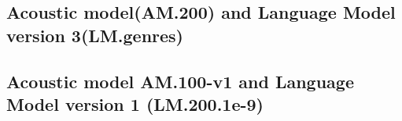 

 


\subsection{Acoustic model(AM.200) and Language Model version 3(LM.genres)}


\subsection{Acoustic model AM.100-v1 and Language Model version 1 (LM.200.1e-9)}
